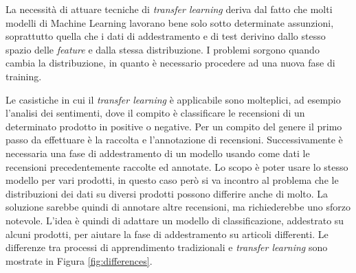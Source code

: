 La necessità di attuare tecniche di \textit{transfer learning} deriva dal fatto che molti modelli di Machine Learning lavorano bene solo sotto determinate assunzioni, soprattutto quella che i dati di addestramento e di test derivino dallo stesso spazio delle \textit{feature} e dalla stessa distribuzione. I problemi sorgono quando cambia la distribuzione, in quanto è necessario procedere ad una nuova fase di training. 

Le casistiche in cui il \textit{transfer learning} è applicabile sono molteplici, ad esempio l'analisi dei sentimenti, dove il compito è classificare le recensioni di un determinato prodotto in positive o negative. Per un compito del genere il primo passo da effettuare è la raccolta e l'annotazione di recensioni. Successivamente è necessaria una fase di addestramento di un modello usando come dati le recensioni precedentemente raccolte ed annotate.
Lo scopo è poter usare lo stesso modello per vari prodotti, in questo caso però si va incontro al problema che le distribuzioni dei dati su diversi prodotti possono differire anche di molto. La soluzione sarebbe quindi di annotare altre recensioni, ma richiederebbe uno sforzo notevole. L'idea è quindi di adattare un modello di classificazione, addestrato su alcuni prodotti, per aiutare la fase di addestramento su articoli differenti.
Le differenze tra processi di apprendimento tradizionali e \textit{transfer learning} sono mostrate in Figura \ref{fig:differences}.
